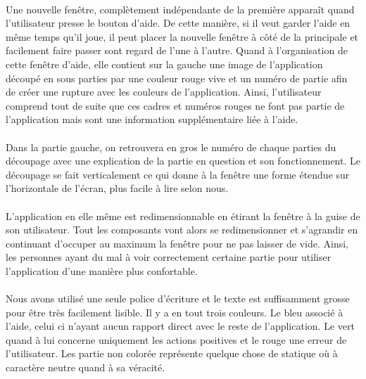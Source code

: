 \documentclass[a4paper, 12pt]{article}
\begin{document}
    \paragraph{}
    Une nouvelle fenêtre, complètement indépendante de la première apparaît quand l'utilisateur presse le bouton d'aide. De cette manière, si il veut garder l'aide en même temps qu'il joue, il peut placer la nouvelle fenêtre à côté de la principale et facilement faire passer sont regard de l'une à l'autre.
    Quand à l'organisation de cette fenêtre d'aide, elle contient sur la gauche une image de l'application découpé en sous parties par une couleur rouge vive et un numéro de partie afin de créer une rupture avec les couleurs de l'application. Ainsi, l'utilisateur comprend tout de suite que ces cadres et numéros rouges ne font pas partie de l'application mais sont une information supplémentaire liée à l'aide.
    
    \paragraph{}
    Dans la partie gauche, on retrouvera en gros le numéro de chaque parties du découpage avec une explication de la partie en question et son fonctionnement.  Le découpage se fait verticalement ce qui donne à la fenêtre une forme étendue sur l'horizontale de l'écran, plus facile à lire selon nous.
     
    \paragraph{}
    L'application en elle même est redimensionnable en étirant la fenêtre à la guise de son utilisateur. Tout les composants vont alors se redimensionner et s'agrandir en continuant d'occuper au maximum la fenêtre pour ne pas laisser de vide. Ainsi, les personnes ayant du mal à voir correctement certaine partie pour utiliser l'application d'une manière plus confortable.
      
    \paragraph{}
    Nous avons utilisé une seule police d'écriture et le texte est suffisamment grosse pour être très facilement lisible. Il y a en tout trois couleurs. Le bleu associé à l'aide, celui ci n'ayant aucun rapport direct avec le reste de l'application. Le vert quand à lui concerne uniquement les actions positives et le rouge une erreur de l'utilisateur. Les partie non colorée représente quelque chose de statique où à caractère neutre quand à sa véracité.
    
\end{document}
